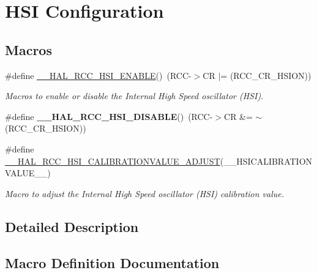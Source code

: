 \hypertarget{group___r_c_c___h_s_i___configuration}{}\section{H\+SI Configuration}
\label{group___r_c_c___h_s_i___configuration}
\subsection*{Macros}
\begin{DoxyCompactItemize}
\item 
\#define \mbox{\hyperlink{group___r_c_c___h_s_i___configuration_gaab944f562b53fc74bcc0e4958388fd42}{\+\_\+\+\_\+\+H\+A\+L\+\_\+\+R\+C\+C\+\_\+\+H\+S\+I\+\_\+\+E\+N\+A\+B\+LE}}()~(R\+CC-\/$>$CR $\vert$= (R\+C\+C\+\_\+\+C\+R\+\_\+\+H\+S\+I\+ON))
\begin{DoxyCompactList}\small\item\em Macros to enable or disable the Internal High Speed oscillator (H\+SI). \end{DoxyCompactList}\item 
\mbox{\label{group___r_c_c___h_s_i___configuration_ga0c0dc8bc0ef58703782f45b4e487c031}} 
\#define {\bfseries \+\_\+\+\_\+\+H\+A\+L\+\_\+\+R\+C\+C\+\_\+\+H\+S\+I\+\_\+\+D\+I\+S\+A\+B\+LE}()~(R\+CC-\/$>$CR \&= $\sim$(R\+C\+C\+\_\+\+C\+R\+\_\+\+H\+S\+I\+ON))
\item 
\#define \mbox{\hyperlink{group___r_c_c___h_s_i___configuration_ga74c3b20fdb9a7672c50aa97bb46537b1}{\+\_\+\+\_\+\+H\+A\+L\+\_\+\+R\+C\+C\+\_\+\+H\+S\+I\+\_\+\+C\+A\+L\+I\+B\+R\+A\+T\+I\+O\+N\+V\+A\+L\+U\+E\+\_\+\+A\+D\+J\+U\+ST}}(\+\_\+\+\_\+\+H\+S\+I\+C\+A\+L\+I\+B\+R\+A\+T\+I\+O\+N\+V\+A\+L\+U\+E\+\_\+\+\_\+)
\begin{DoxyCompactList}\small\item\em Macro to adjust the Internal High Speed oscillator (H\+SI) calibration value. \end{DoxyCompactList}\end{DoxyCompactItemize}


\subsection{Detailed Description}


\subsection{Macro Definition Documentation}
\mbox{\label{group___r_c_c___h_s_i___configuration_ga74c3b20fdb9a7672c50aa97bb46537b1}} 
